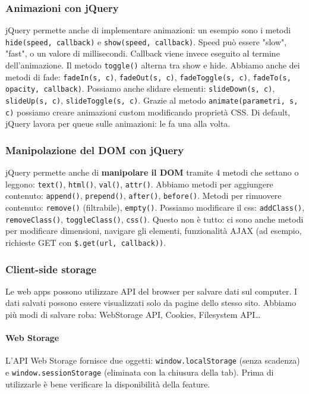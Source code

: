 \documentclass[11pt]{article}
\newcommand{\code}[1]{\texttt{#1}}
\begin{document}
\subsubsection{Animazioni con jQuery}
jQuery permette anche di implementare animazioni: un esempio sono i metodi \code{hide(speed, callback)} e \code{show(speed, callback)}. Speed può essere "slow", "fast", o un valore di millisecondi. Callback viene invece eseguito al termine dell'animazione. Il metodo \code{toggle()} alterna tra show e hide. Abbiamo anche dei metodi di fade: \code{fadeIn(s, c)}, \code{fadeOut(s, c)}, \code{fadeToggle(s, c)}, \code{fadeTo(s, opacity, callback)}. Possiamo anche slidare elementi: \code{slideDown(s, c)}, \code{slideUp(s, c)}, \code{slideToggle(s, c)}. Grazie al metodo \code{animate(\textbraceleft parametri\textbraceright, s, c)} possiamo creare animazioni custom modificando proprietà CSS. Di default, jQuery lavora per queue sulle animazioni: le fa una alla volta.
\subsubsection{Manipolazione del DOM con jQuery}
jQuery permette anche di \textbf{manipolare il DOM} tramite 4 metodi che settano o leggono: \code{text()}, \code{html()}, \code{val()}, \code{attr()}. Abbiamo metodi per aggiungere contenuto: \code{append()}, \code{prepend()}, \code{after()}, \code{before()}. Metodi per rimuovere contenuto: \code{remove()} (filtrabile), \code{empty()}. Possiamo modificare il css: \code{addClass()}, \code{removeClass()}, \code{toggleClass()}, \code{css()}. Questo non è tutto: ci sono anche metodi per modificare dimensioni, navigare gli elementi, funzionalità AJAX (ad esempio, richieste GET con \code{\$.get(url, callback))}.
\subsubsection{Client-side storage}
Le web apps possono utilizzare API del browser per salvare dati sul computer. I dati salvati possono essere visualizzati solo da pagine dello stesso sito. Abbiamo più modi di salvare roba: WebStorage API, Cookies, Filesystem API\dots
\paragraph{Web Storage} L'API Web Storage fornisce due oggetti: \code{window.localStorage} (senza scadenza) e \code{window.sessionStorage} (eliminata con la chiusura della tab). Prima di utilizzarle è bene verificare la disponibilità della feature. 
\end{document}
